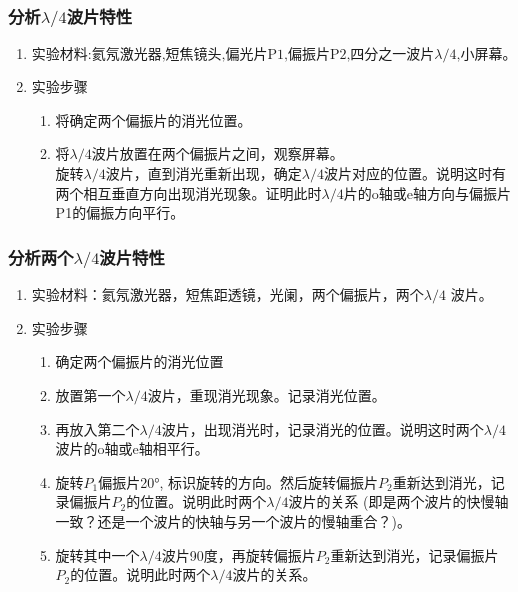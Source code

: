 \documentclass[dvipsnames, svgnames,a4paper,11pt]{article}
\begin{document}
\subsubsection{分析$\lambda/4$波片特性}
\begin{enumerate}
	
	\item$\text{实验材料:氦氖激光器,短焦镜头,偏光片P1,偏振片P2,四分之一波片}\lambda/4\text{,小屏幕。}$
	\item 实验步骤


	\begin{enumerate}
		\item  将确定两个偏振片的消光位置。
		\item 将$\lambda/4$波片放置在两个偏振片之间，观察屏幕。\\
		旋转$\lambda/4$波片，直到消光重新出现，确定$\lambda/4$波片对应的位置。说明这时有两个相互垂直方向出现消光现象。证明此时$\lambda/4$片的o轴或e轴方向与偏振片P1的偏振方向平行。
		
	\end{enumerate}




\end{enumerate}
\subsubsection{分析两个$\lambda/4$波片特性}
\begin{enumerate}
	
	\item 实验材料：氦氖激光器，短焦距透镜，光阑，两个偏振片，两个$\lambda/4$ 波片。
	\item 实验步骤
   \begin{enumerate}
		\item  确定两个偏振片的消光位置
		\item 放置第一个$\lambda/4$波片，重现消光现象。记录消光位置。
		\item  再放入第二个$\lambda/4$波片，出现消光时，记录消光的位置。说明这时两个$\lambda/4$波片的o轴或e轴相平行。
		
		\item  旋转$P_1$偏振片20°, 标识旋转的方向。然后旋转偏振片$P_2$重新达到消光，记录偏振片$P_2$的位置。说明此时两个$\lambda/4$波片的关系 (即是两个波片的快慢轴一致？还是一个波片的快轴与另一个波片的慢轴重合？)。
		
		\item  旋转其中一个$\lambda/4$波片90度，再旋转偏振片$P_2$重新达到消光，记录偏振片$P_2$的位置。说明此时两个$\lambda/4$波片的关系。
		
	\end{enumerate}




\end{enumerate}
\end{document}
